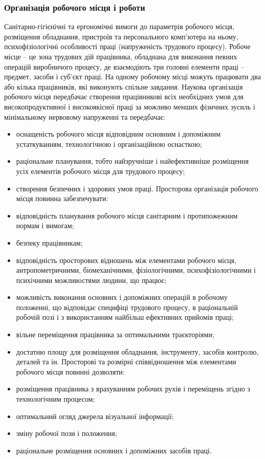 \documentclass[12pt,a4paper]{article}
\begin{document}
\subsubsection{Організація робочого місця і роботи}
Санітарно-гігієнічні та ергономічні вимоги до параметрів робочого місця, розміщення обладнання, пристроїв та персонального комп’ютера на ньому, психофізіологічні особливості праці (напруженість трудового процесу).
Робоче місце – це зона трудових дій працівника, обладнана для виконання певних операцій виробничого процесу, де взаємодіють три головні елементи праці – предмет, засоби і суб’єкт праці. На одному робочому місці можуть працювати два або кілька працівників, які виконують спільне завдання.  Наукова організація робочого місця передбачає створення працівникові всіх необхідних умов для високопродуктивної і високоякісної праці за можливо менших фізичних зусиль і мінімальному нервовому напруженні та передбачає:
\begin{itemize}
\item оснащеність робочого місця відповідним основним і допоміжним устаткуванням, технологічною і організаційною оснасткою;
\item раціональне планування, тобто найзручніше і найефективніше розміщення усіх елементів робочого місця для трудового процесу;
\item створення безпечних і здорових умов праці.
Просторова організація робочого місця повинна забезпечувати:
\item відповідність планування робочого місця санітарним і протипожежним нормам і вимогам;
\item безпеку працівникам;
\item відповідність просторових відношень між елементами робочого місця, антропометричними, біомеханічними, фізіологічними, психофізіологічними і психічними можливостями людини, що працює;
\item можливість виконання основних і допоміжних операцій в робочому положенні, що відповідає специфіці трудового процесу, в раціональній робочій позі і з використанням найбільш ефективних прийомів праці;
\item вільне переміщення працівника за оптимальними траєкторіями;
\item достатню площу для розміщення обладнання, інструменту, засобів контролю, деталей та ін.
Просторові та розмірні співвідношення між елементами робочого місця повинні дозволяти:
\item розміщення працівника з врахуванням робочих рухів і переміщень згідно з технологічним процесом;
\item оптимальний огляд джерела візуальної інформації;
\item зміну робочої пози і положення;
\item раціональне розміщення основних і допоміжних засобів праці.
\end{itemize}
\end{document}
